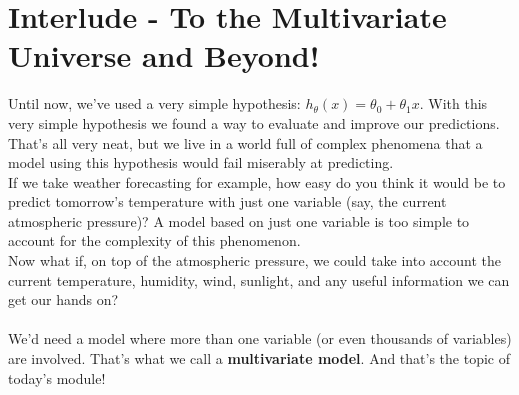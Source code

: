 
\section*{Interlude - To the Multivariate Universe and Beyond!}

Until now, we've used a very simple hypothesis: $h_{\theta}(x) = \theta_0 + \theta_1 x$.
With this very simple hypothesis we found a way to evaluate and improve our predictions.\\
\newline
That's all very neat, but we live in a world full of complex phenomena that a model using
this hypothesis would fail miserably at predicting.\\
\newline
If we take weather forecasting for example, how easy do you think it would be to predict tomorrow's temperature with just one variable (say, the current atmospheric pressure)?
A model based on just one variable is too simple to account for the complexity of this phenomenon.\\
\newline
Now what if, on top of the atmospheric pressure, we could take into account 
the current temperature, humidity, wind, sunlight, and any useful information we can get our hands on?\\
\\
We'd need a model where more than one variable (or even thousands of variables) are involved.
That's what we call a \textbf{multivariate model}. And that's the topic of today's module!\\

\newpage
